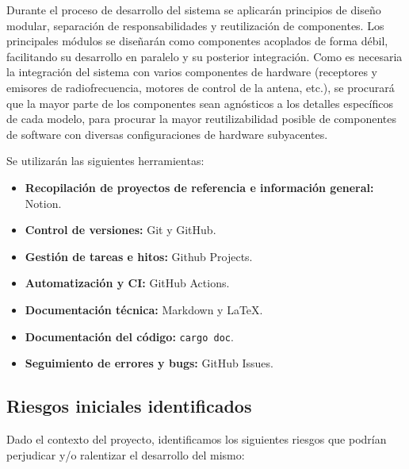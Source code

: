 Durante el proceso de desarrollo del sistema se aplicarán principios de diseño modular, separación de responsabilidades y reutilización de componentes. Los principales módulos se diseñarán como componentes acoplados de forma débil, facilitando su desarrollo en paralelo y su posterior integración. Como es necesaria la integración del sistema con varios componentes de hardware (receptores y emisores de radiofrecuencia, motores de control de la antena, etc.), se procurará que la mayor parte de los componentes sean agnósticos a los detalles específicos de cada modelo, para procurar la mayor reutilizabilidad posible de componentes de software con diversas configuraciones de hardware subyacentes.

Se utilizarán las siguientes herramientas:

\begin{itemize}
    \item \textbf{Recopilación de proyectos de referencia e información general:} Notion.
    \item \textbf{Control de versiones:} Git y GitHub.
    \item \textbf{Gestión de tareas e hitos:} Github Projects.
    \item \textbf{Automatización y CI:} GitHub Actions.
    \item \textbf{Documentación técnica:} Markdown y LaTeX.
    \item \textbf{Documentación del código:} \texttt{cargo doc}.
    \item \textbf{Seguimiento de errores y bugs:} GitHub Issues.
\end{itemize}

\subsection*{Riesgos iniciales identificados}

Dado el contexto del proyecto, identificamos los siguientes riesgos que podrían perjudicar y/o ralentizar el desarrollo del mismo:


